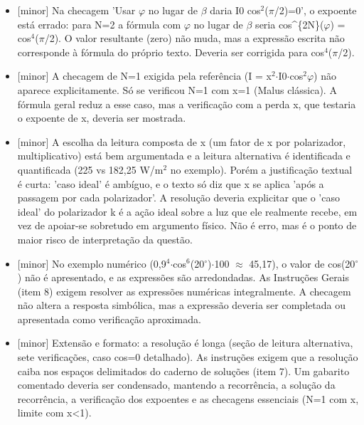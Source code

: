 \documentclass{article}%
\begin{document}
\begin{itemize}%
\item%
{[}minor{]} Na checagem 'Usar $\varphi$ no lugar de $\beta$ daria I0 cos$^2$($\pi$/2)=0', o expoente está errado: para N=2 a fórmula com $\varphi$ no lugar de $\beta$ seria cos\^{}\{2N\}($\varphi$) = cos$^{4}$($\pi$/2). O valor resultante (zero) não muda, mas a expressão escrita não corresponde à fórmula do próprio texto. Deveria ser corrigida para cos$^{4}$($\pi$/2).%
\item%
{[}minor{]} A checagem de N=1 exigida pela referência (I = x$^2$$\cdot$I0$\cdot$cos$^2$$\varphi$) não aparece explicitamente. Só se verificou N=1 com x=1 (Malus clássica). A fórmula geral reduz a esse caso, mas a verificação com a perda x, que testaria o expoente de x, deveria ser mostrada.%
\item%
{[}minor{]} A escolha da leitura composta de x (um fator de x por polarizador, multiplicativo) está bem argumentada e a leitura alternativa é identificada e quantificada (225 vs 182,25 W/m$^2$ no exemplo). Porém a justificação textual é curta: 'caso ideal' é ambíguo, e o texto só diz que x se aplica 'após a passagem por cada polarizador'. A resolução deveria explicitar que o 'caso ideal' do polarizador k é a ação ideal sobre a luz que ele realmente recebe, em vez de apoiar{-}se sobretudo em argumento físico. Não é erro, mas é o ponto de maior risco de interpretação da questão.%
\item%
{[}minor{]} No exemplo numérico (0,9$^{4}$$\cdot$cos$^{6}$(20$^\circ$)$\cdot$100 $\approx$ 45,17), o valor de cos(20$^\circ$) não é apresentado, e as expressões são arredondadas. As Instruções Gerais (item 8) exigem resolver as expressões numéricas integralmente. A checagem não altera a resposta simbólica, mas a expressão deveria ser completada ou apresentada como verificação aproximada.%
\item%
{[}minor{]} Extensão e formato: a resolução é longa (seção de leitura alternativa, sete verificações, caso cos=0 detalhado). As instruções exigem que a resolução caiba nos espaços delimitados do caderno de soluções (item 7). Um gabarito comentado deveria ser condensado, mantendo a recorrência, a solução da recorrência, a verificação dos expoentes e as checagens essenciais (N=1 com x, limite com x<1).%
\end{itemize}%
\end{document}
